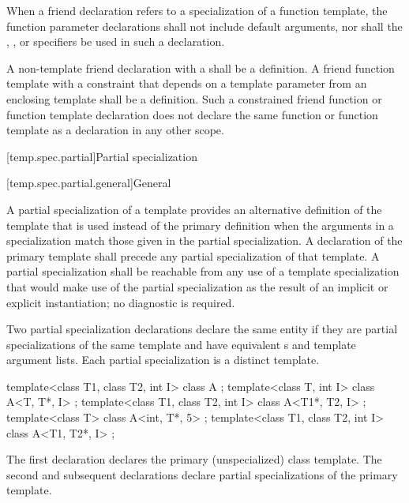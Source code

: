 \pnum
When a friend declaration refers to a specialization of a function
template, the function parameter declarations shall not include
default arguments, nor shall
the , , or  specifiers
be used in such a declaration.

\pnum
A non-template friend declaration
with a 
shall be a definition.
A friend function template
with a constraint that depends on a template parameter from an enclosing template
shall be a definition.
Such a constrained friend function or function template declaration
does not declare the same function or function template as a declaration in any other scope.

[temp.spec.partial]{Partial specialization}

[temp.spec.partial.general]{General}

\pnum
{}%
A partial specialization of a template provides an alternative definition
of the template that is used instead of the primary definition when the
arguments in a specialization match those given in the partial
specialization.
A declaration of the primary template shall precede
any partial specialization of
that template.
A partial specialization shall be reachable from any use of a template
specialization that would make use of the partial specialization as the result of
an implicit or explicit instantiation; no diagnostic is required.

\pnum
Two partial specialization declarations declare the same entity
if they are partial specializations of the same template and have equivalent
s and template argument lists.
Each partial specialization is a distinct template.

\pnum
\begin{example}
\begin{codeblock}
template<class T1, class T2, int I> class A             { };
template<class T, int I>            class A<T, T*, I>   { };
template<class T1, class T2, int I> class A<T1*, T2, I> { };
template<class T>                   class A<int, T*, 5> { };
template<class T1, class T2, int I> class A<T1, T2*, I> { };
\end{codeblock}

The first declaration declares the primary (unspecialized) class template.
The second and subsequent declarations declare partial specializations of
the primary template.
\end{example}

